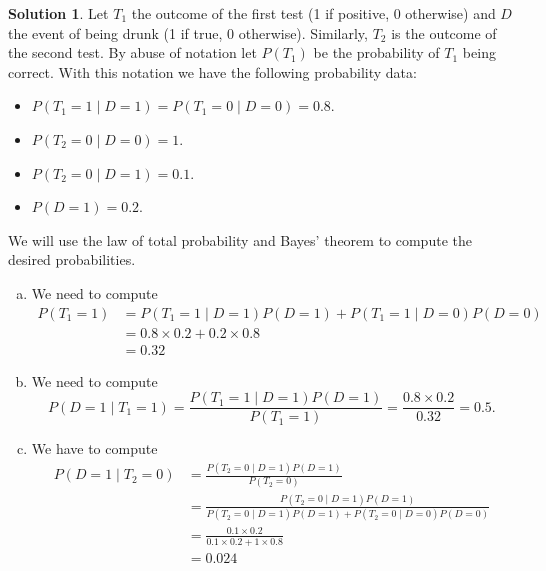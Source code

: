 \documentclass{article}
\theoremstyle{plain}
\theoremstyle{definition}
\newtheorem*{sol*}{Solution}
\begin{document}
\begin{sol*}
Let $T_1$ the outcome of the first test (1 if positive, 0 otherwise) and $D$ the event of being drunk (1 if true, 0 otherwise). Similarly, $T_2$ is the outcome of the second test. By abuse of notation let $P(T_1)$ be the probability of $T_1$ being correct. With this notation we have the following probability data:

\begin{itemize}
\item $P(T_1 = 1\mid D = 1)=P(T_1 = 0\mid D = 0)=0.8$.%

\item $P(T_2 = 0\mid D = 0)= 1$.

\item $P(T_2 = 0\mid D = 1)=0.1$.

\item $P(D=1)=0.2$.
\end{itemize}
We will use the law of total probability and Bayes' theorem to compute the desired probabilities.
\begin{enumerate}[(a)]
\item We need to compute
\begin{align*}
P(T_1=1)&=P(T_1=1\mid D=1)P(D=1)+P(T_1=1\mid D=0)P(D=0)\\
&=0.8\times 0.2 +  0.2\times 0.8 \\
&= 0.32
\end{align*}

\item We need to compute
\[P(D = 1 \mid T_1=1)= \frac{P(T_1=1\mid D=1)P(D=1)}{P(T_1 = 1)}=\frac{0.8\times 0.2}{0.32}=0.5.\]
\item We have to compute
\begin{align*}
P(D=1\mid T_2=0) &= \frac{P(T_2=0\mid D=1)P(D=1)}{P(T_2=0)}\\
&=\frac{P(T_2=0\mid D=1)P(D=1)}{P(T_2=0\mid D=1)P(D=1)+P(T_2=0\mid D=0)P(D=0)}\\
&=\frac{0.1\times 0.2}{0.1\times 0.2 + 1\times 0.8}\\
&=0.024
\end{align*}
\end{enumerate}
\end{sol*}
\end{document}
